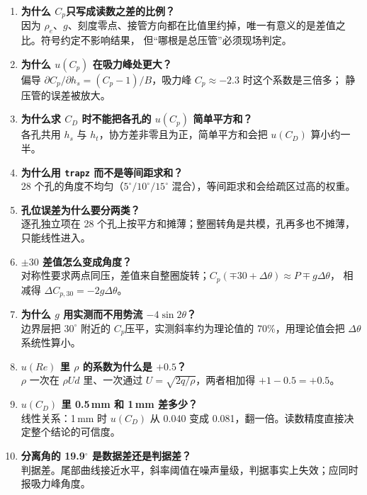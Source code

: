 \documentclass[11pt,a4paper]{ctexart}
\newcommand{\Cp}{\ensuremath{C_p}}
\newcommand{\CD}{\ensuremath{C_D}}
\newcommand{\ReD}{\ensuremath{\mathit{Re}}}
\begin{document}
\begin{enumerate}[leftmargin=1.6em,itemsep=4pt]
\item \textbf{为什么 \Cp 只写成读数之差的比例？}\\
因为 $\rho_e$、$g$、刻度零点、接管方向都在比值里约掉，唯一有意义的是差值之比。符号约定不影响结果，
但“哪根是总压管”必须现场判定。

\item \textbf{为什么 $u(\Cp)$ 在吸力峰处更大？}\\
偏导 $\partial \Cp/\partial h_s = (\Cp - 1)/B$，吸力峰 $\Cp \approx -2.3$ 时这个系数是三倍多；
静压管的误差被放大。

\item \textbf{为什么求 \CD{} 时不能把各孔的 $u(\Cp)$ 简单平方和？}\\
各孔共用 $h_s$ 与 $h_t$，协方差非零且为正，简单平方和会把 $u(\CD)$ 算小约一半。

\item \textbf{为什么用 \texttt{trapz} 而不是等间距求和？}\\
28 个孔的角度不均匀（$5^\circ/10^\circ/15^\circ$ 混合），等间距求和会给疏区过高的权重。

\item \textbf{孔位误差为什么要分两类？}\\
逐孔独立项在 28 个孔上按平方和摊薄；整圈转角是共模，孔再多也不摊薄，只能线性进入。

\item \textbf{$\pm30$ 差值怎么变成角度？}\\
对称性要求两点同压，差值来自整圈旋转；$\Cp(\mp30 + \Delta\theta) \approx P \mp g\Delta\theta$，
相减得 $\Delta C_{p,30} = -2g\Delta\theta$。

\item \textbf{为什么 $g$ 用实测而不用势流 $-4\sin 2\theta$？}\\
边界层把 $30^\circ$ 附近的 \Cp 压平，实测斜率约为理论值的 70\%，用理论值会把 $\Delta\theta$ 系统性算小。

\item \textbf{$u(\ReD)$ 里 $\rho$ 的系数为什么是 $+0.5$？}\\
$\rho$ 一次在 $\rho U d$ 里、一次通过 $U = \sqrt{2q/\rho}$，两者相加得 $+1 - 0.5 = +0.5$。

\item \textbf{$u(\CD)$ 里 0.5\,mm 和 1\,mm 差多少？}\\
线性关系：1\,mm 时 $u(\CD)$ 从 0.040 变成 0.081，翻一倍。读数精度直接决定整个结论的可信度。

\item \textbf{分离角的 19.9$^\circ$ 是数据差还是判据差？}\\
判据差。尾部曲线接近水平，斜率阈值在噪声量级，判据事实上失效；应同时报吸力峰角度。
\end{enumerate}
\end{document}
